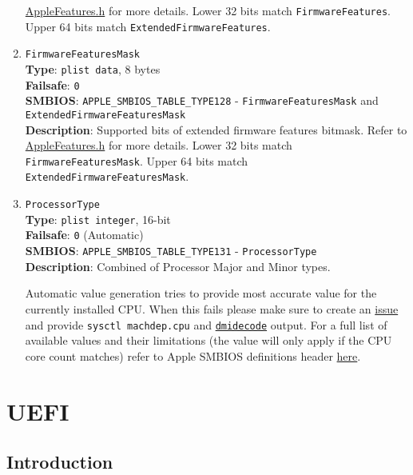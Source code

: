 \documentclass[]{article}
\begin{document}
\begin{enumerate}
  \href{https://github.com/acidanthera/OpenCorePkg/blob/master/Include/Apple/IndustryStandard/AppleFeatures.h}{AppleFeatures.h}
  for more details. Lower 32 bits match \texttt{FirmwareFeatures}. Upper
  64 bits match \texttt{ExtendedFirmwareFeatures}.
\item
  \texttt{FirmwareFeaturesMask}\\
  \textbf{Type}: \texttt{plist\ data}, 8 bytes\\
  \textbf{Failsafe}: \texttt{0}\\
  \textbf{SMBIOS}: \texttt{APPLE\_SMBIOS\_TABLE\_TYPE128} -
  \texttt{FirmwareFeaturesMask} and
  \texttt{ExtendedFirmwareFeaturesMask}\\
  \textbf{Description}: Supported bits of extended firmware features
  bitmask. Refer to
  \href{https://github.com/acidanthera/OpenCorePkg/blob/master/Include/Apple/IndustryStandard/AppleFeatures.h}{AppleFeatures.h}
  for more details. Lower 32 bits match \texttt{FirmwareFeaturesMask}.
  Upper 64 bits match \texttt{ExtendedFirmwareFeaturesMask}.
\item
  \texttt{ProcessorType}\\
  \textbf{Type}: \texttt{plist\ integer}, 16-bit\\
  \textbf{Failsafe}: \texttt{0} (Automatic)\\
  \textbf{SMBIOS}: \texttt{APPLE\_SMBIOS\_TABLE\_TYPE131} -
  \texttt{ProcessorType}\\
  \textbf{Description}: Combined of Processor Major and Minor types.

  Automatic value generation tries to provide most accurate value for
  the currently installed CPU. When this fails please make sure to create
  an \href{https://github.com/acidanthera/bugtracker/issues}{issue} and
  provide \texttt{sysctl machdep.cpu} and
  \href{https://github.com/acidanthera/dmidecode}{\texttt{dmidecode}} output.
  For a full list of available values and their limitations (the value will
  only apply if the CPU core count matches) refer to Apple SMBIOS definitions header
  \href{https://github.com/acidanthera/OpenCorePkg/blob/master/Include/Apple/IndustryStandard/AppleSmBios.h}{here}.
\end{enumerate}

\section{UEFI}\label{uefi}

\subsection{Introduction}\label{uefiintro}
\end{document}
